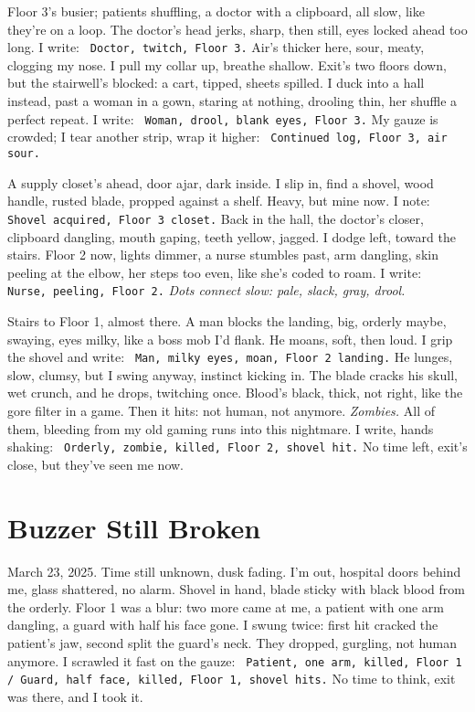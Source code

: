 \documentclass[12pt]{article}
\newcommand{\note}[1]{\texttt{\small \color{DarkGray} #1}}
\begin{document}
Floor 3’s busier; patients shuffling, a doctor with a clipboard, all slow, like they’re on a loop. The doctor’s head jerks, sharp, then still, eyes locked ahead too long. I write: \note{Doctor, twitch, Floor 3.} Air’s thicker here, sour, meaty, clogging my nose. I pull my collar up, breathe shallow. Exit’s two floors down, but the stairwell’s blocked: a cart, tipped, sheets spilled. I duck into a hall instead, past a woman in a gown, staring at nothing, drooling thin, her shuffle a perfect repeat. I write: \note{Woman, drool, blank eyes, Floor 3.} My gauze is crowded; I tear another strip, wrap it higher: \note{Continued log, Floor 3, air sour.}

A supply closet’s ahead, door ajar, dark inside. I slip in, find a shovel, wood handle, rusted blade, propped against a shelf. Heavy, but mine now. I note: \note{Shovel acquired, Floor 3 closet.} Back in the hall, the doctor’s closer, clipboard dangling, mouth gaping, teeth yellow, jagged. I dodge left, toward the stairs. Floor 2 now, lights dimmer, a nurse stumbles past, arm dangling, skin peeling at the elbow, her steps too even, like she’s coded to roam. I write: \note{Nurse, peeling, Floor 2.} \textit{Dots connect slow: pale, slack, gray, drool.}

Stairs to Floor 1, almost there. A man blocks the landing, big, orderly maybe, swaying, eyes milky, like a boss mob I’d flank. He moans, soft, then loud. I grip the shovel and write: \note{Man, milky eyes, moan, Floor 2 landing.} He lunges, slow, clumsy, but I swing anyway, instinct kicking in. The blade cracks his skull, wet crunch, and he drops, twitching once. Blood’s black, thick, not right, like the gore filter in a game. Then it hits: not human, not anymore. \textit{Zombies.} All of them, bleeding from my old gaming runs into this nightmare. I write, hands shaking: \note{Orderly, zombie, killed, Floor 2, shovel hit.} No time left, exit’s close, but they’ve seen me now.

\section{Buzzer Still Broken}

March 23, 2025. Time still unknown, dusk fading. I’m out, hospital doors behind me, glass shattered, no alarm. Shovel in hand, blade sticky with black blood from the orderly. Floor 1 was a blur: two more came at me, a patient with one arm dangling, a guard with half his face gone. I swung twice: first hit cracked the patient’s jaw, second split the guard’s neck. They dropped, gurgling, not human anymore. I scrawled it fast on the gauze: \note{Patient, one arm, killed, Floor 1 / Guard, half face, killed, Floor 1, shovel hits.} No time to think, exit was there, and I took it.
\end{document}
